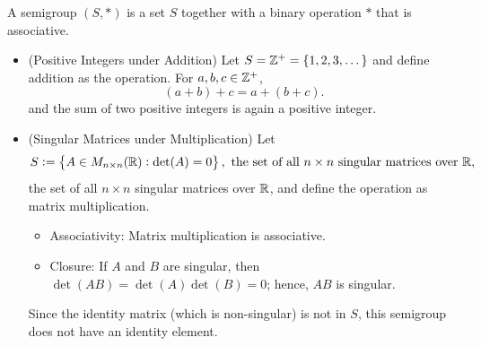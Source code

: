 \documentclass[11pt,openany]{article}
\begin{document}
\newpage
{}

\begin{example}
A semigroup $(S,*)$ is a set $S$ together with a binary operation $*$ that is associative. \begin{itemize}
	\item (Positive Integers under Addition) Let $S=\mathbb{Z}^+=\set{1,2,3,\dots}$ and define addition as the operation. For $a,b,c\in\mathbb{Z}^+$, \[
	(a+b)+c=a+(b+c).
	\] and the sum of two positive integers is again a positive integer.
	\item (Singular Matrices under Multiplication) Let \[
	S:=\set{A\in M_{n\times n}(\R):\det(A)=0},\ \text{the set of all $n\times n$ singular matrices over $\R$},
	\] the set of all $n\times n$ singular matrices over $\mathbb{R}$, and define the operation as matrix multiplication.
	\begin{itemize}
		\item Associativity: Matrix multiplication is associative.
		\item Closure: If $A$ and $B$ are singular, then $\det(AB)=\det(A)\det(B)=0$; hence, $AB$ is singular.
	\end{itemize}
	Since the identity matrix (which is non-singular) is not in $S$, this semigroup does not have an identity element.
\end{itemize}
\end{example}
\end{document}

